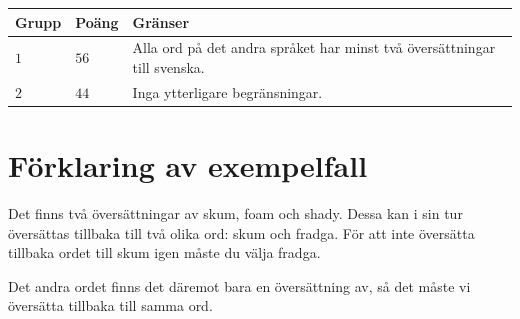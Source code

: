 \noindent
\begin{tabular}{| l | l | p{12cm} |}
  \hline
  \textbf{Grupp} & \textbf{Poäng} & \textbf{Gränser} \\ \hline
  $1$    & $56$      & Alla ord på det andra språket har minst två översättningar till svenska. \\ \hline
  $2$    & $44$      & Inga ytterligare begränsningar. \\ \hline
\end{tabular}

\section*{Förklaring av exempelfall}
Det finns två översättningar av skum, foam och shady.
Dessa kan i sin tur översättas tillbaka till två olika ord: skum och fradga.
För att inte översätta tillbaka ordet till skum igen måste du välja fradga.

Det andra ordet finns det däremot bara en översättning av, så det måste vi översätta tillbaka till samma ord.

